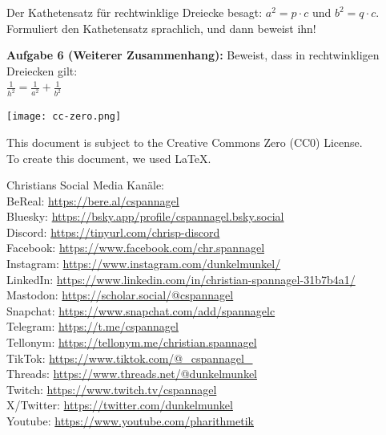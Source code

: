 \documentclass[12pt,a4paper,oneside,ngerman]{article}
\begin{document}
Der Kathetensatz für rechtwinklige Dreiecke besagt: $a^2=p\cdot c$ und $b^2=q\cdot c$. Formuliert den Kathetensatz sprachlich, und dann beweist ihn! 


\textbf{Aufgabe 6 (Weiterer Zusammenhang):} Beweist, dass in rechtwinkligen Dreiecken gilt:\\
\begin{math}\frac{1}{h^2}=\frac{1}{a^2}+\frac{1}{b^2}\end{math}

\vspace*{10mm}
\texttt{[image: cc-zero.png]}

\tiny{This document is subject to the Creative Commons Zero (CC0) License.
\\ To create this document, we used \LaTeX{}.

Christians Social Media Kanäle:\\
BeReal: \url{https://bere.al/cspannagel}\\
Bluesky: \url{https://bsky.app/profile/cspannagel.bsky.social}\\
Discord: \url{https://tinyurl.com/chrisp-discord}\\
Facebook: \url{https://www.facebook.com/chr.spannagel}\\
Instagram: \url{https://www.instagram.com/dunkelmunkel/}\\
LinkedIn: \url{https://www.linkedin.com/in/christian-spannagel-31b7b4a1/}\\
Mastodon: \url{https://scholar.social/@cspannagel}\\
Snapchat: \url{https://www.snapchat.com/add/spannagelc}\\
Telegram: \url{https://t.me/cspannagel}\\
Tellonym: \url{https://tellonym.me/christian.spannagel}\\
TikTok: \url{https://www.tiktok.com/@_cspannagel_}\\
Threads: \url{https://www.threads.net/@dunkelmunkel}\\
Twitch: \url{https://www.twitch.tv/cspannagel}\\
X/Twitter: \url{https://twitter.com/dunkelmunkel}\\
Youtube: \url{https://www.youtube.com/pharithmetik}}\\


\end{document}
